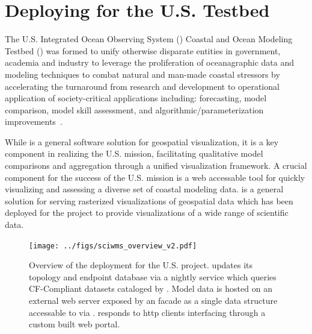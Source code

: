 \section{Deploying \sciwms{} for the U.S. \ioos{} \comt{} Testbed}

The U.S. Integrated Ocean Observing System (\ioos{}) Coastal and Ocean
Modeling Testbed (\comt{}) was formed to unify otherwise disparate
entities in government, academia and industry to leverage the
proliferation of oceanagraphic data and modeling techniques to combat
natural and man-made coastal stressors by accelerating the turnaround
from research and development to operational application of
society-critical applications including: forecasting, model
comparison, model skill assessment, and algorithmic/parameterization
improvements~\cite{luettich13}.
  
While \sciwms{} is a general software solution for geospatial
visualization, it is a key component in realizing the U.S. \ioos{}
\comt{} mission, facilitating qualitative model comparisons and
aggregation through a unified visualization framework. A crucial
component for the success of the U.S. \ioos{} \comt{} mission is a web
accessable tool for quickly visualizing and assessing a diverse set of
coastal modeling data. \sciwms{} is a general \ogc{} \wms{} solution
for serving rasterized visualizations of geospatial data which has
been deployed for the \comt{} project to provide visualizations of a
wide range of scientific data.

\begin{figure}[ht!]
  \centering
  \texttt{[image: ../figs/sciwms\_overview\_v2.pdf]}
  \caption{Overview of the \sciwms{} deployment for the U.S. \ioos{}
    \comt{} project. \Sciwms{} updates its topology and endpoint
    database via a nightly service which queries CF-Compliant datasets
    cataloged by \ngdc{}. Model data is hosted on an external web server
    exposed by an \ncml{} facade as a single \netcdf{} data structure
    accessable to \sciwms{} via \opendap{}. \Sciwms{} responds to http
    clients interfacing through a custom built web portal.}
  \label{fig:overview1}
\end{figure}


